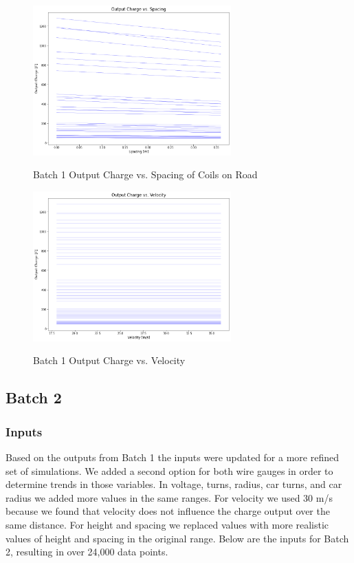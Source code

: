 \begin{figure}
    \begin{center}
    \includegraphics[width=3in]{fig19.png}
    \end{center}
    \renewcommand{\baselinestretch}{1}
    \small\normalsize
    \begin{quote}
    \caption[Batch 1 Output Charge vs. Spacing of Coils on Road]{Batch 1 Output Charge vs. Spacing of Coils on Road} \label{fig: f19}
    \end{quote}
\end{figure}

\begin{figure}
    \begin{center}
    \includegraphics[width=3in]{fig20.png}
    \end{center}
    \renewcommand{\baselinestretch}{1}
    \small\normalsize
    \begin{quote}
    \caption[Batch 1 Output Charge vs. Velocity]{Batch 1 Output Charge vs. Velocity} \label{fig: f20}
    \end{quote}
\end{figure}

\subsection{Batch 2}
\subsubsection{Inputs}
Based on the outputs from Batch 1 the inputs were updated for a more refined set of simulations. 
We added a second option for both wire gauges in order to determine trends in those variables. 
In voltage, turns, radius, car turns, and car radius we added more values in the same ranges. 
For velocity we used 30 m/s because we found that velocity does not influence the charge output over the same 
distance. For height and spacing we replaced values with more realistic values of height and spacing in the original 
range. Below are the inputs for Batch 2, resulting in over 24,000 data points.

